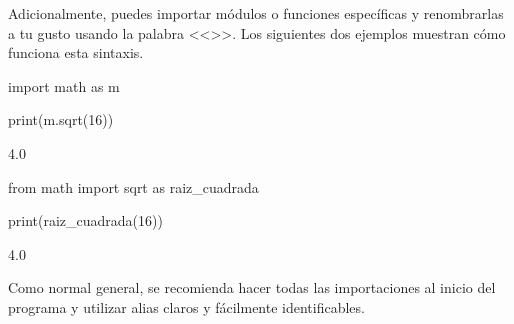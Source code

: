 Adicionalmente, puedes importar módulos o funciones específicas y renombrarlas a tu gusto usando la palabra <<>>. Los siguientes dos ejemplos muestran cómo funciona esta sintaxis.

\begin{pyin}
import math as m

print(m.sqrt(16))
\end{pyin}
\begin{pyprint}
4.0
\end{pyprint}

\begin{pyin}
from math import sqrt as raiz_cuadrada

print(raiz_cuadrada(16))
\end{pyin}
\begin{pyprint}
4.0
\end{pyprint}

Como normal general, se recomienda hacer todas las importaciones al inicio del programa y utilizar alias claros y fácilmente identificables. 

